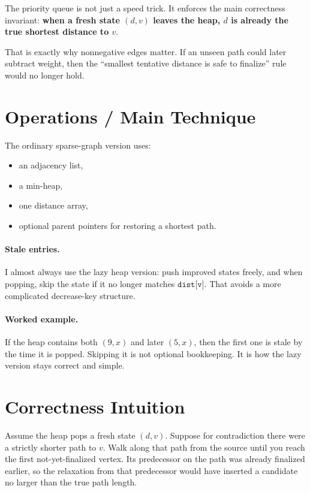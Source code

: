 The priority queue is not just a speed trick. It enforces the main correctness invariant:
\textbf{when a fresh state \((d, v)\) leaves the heap, \(d\) is already the true shortest distance to \(v\)}.

That is exactly why nonnegative edges matter. If an unseen path could later subtract weight, then the ``smallest
tentative distance is safe to finalize'' rule would no longer hold.

\section*{Operations / Main Technique}

The ordinary sparse-graph version uses:

\begin{itemize}
  \item an adjacency list,
  \item a min-heap,
  \item one distance array,
  \item optional parent pointers for restoring a shortest path.
\end{itemize}

\paragraph{Stale entries.}
I almost always use the lazy heap version: push improved states freely, and when popping, skip the state if it no
longer matches \(\texttt{dist[v]}\). That avoids a more complicated decrease-key structure.

\paragraph{Worked example.}
If the heap contains both \((9, x)\) and later \((5, x)\), then the first one is stale by the time it is popped.
Skipping it is not optional bookkeeping. It is how the lazy version stays correct and simple.

\section*{Correctness Intuition}

Assume the heap pops a fresh state \((d, v)\). Suppose for contradiction there were a strictly shorter path to \(v\).
Walk along that path from the source until you reach the first not-yet-finalized vertex. Its predecessor on the path
was already finalized earlier, so the relaxation from that predecessor would have inserted a candidate no larger than
the true path length.

